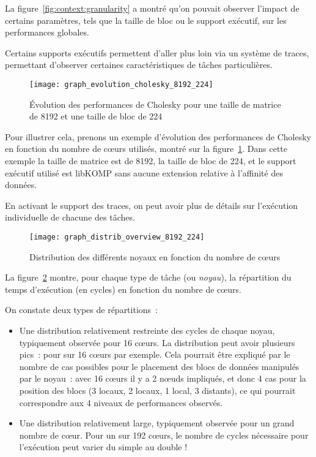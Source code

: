 La figure~\ref{fig:context:granularity} a montré qu'on pouvait observer l'impact de certains paramètres, tels que la taille de bloc ou le support exécutif, sur les performances globales.

Certains supports exécutifs permettent d'aller plus loin via un système de traces, permettant d'observer certaines caractéristiques de tâches particulières.

\begin{figure}[t!]
  \centering
  \texttt{[image: graph\_evolution\_cholesky\_8192\_224]}
  \caption{Évolution des performances de Cholesky pour une taille de matrice de 8192 et une taille de bloc de 224}\label{fig:contribs:apps:cholesky:overview-8192-224}
\end{figure}

Pour illustrer cela, prenons un exemple d'évolution des performances de Cholesky en fonction du nombre de cœurs utilisés, montré sur la figure~\ref{fig:contribs:apps:cholesky:overview-8192-224}. Dans cette exemple la taille de matrice est de 8192, la taille de bloc de 224, et le support exécutif utilisé est libKOMP sans aucune extension relative à l'affinité des données.

En activant le support des traces, on peut avoir plus de détails sur l'exécution individuelle de chacune des tâches.

\begin{figure}[h!]
  \centering
  \texttt{[image: graph\_distrib\_overview\_8192\_224]}
  \caption{Distribution des différents noyaux en fonction du nombre de cœurs}\label{fig:contribs:apps:cholesky:distrib-overview-8192-224}
\end{figure}

La figure~\ref{fig:contribs:apps:cholesky:distrib-overview-8192-224} montre, pour chaque type de tâche (ou \emph{noyau}), la répartition du temps d'exécution (en cycles) en fonction du nombre de cœurs.

On constate deux types de répartitions~:
\begin{itemize}
  \item Une distribution relativement restreinte des cycles de chaque noyau, typiquement observée pour 16 cœurs.
    La distribution peut avoir plusieurs pics~: pour \gemm sur 16 cœurs par exemple.
    Cela pourrait être expliqué par le nombre de cas possibles pour le placement des blocs de données manipulés par le noyau~: avec 16 cœurs il y a 2 nœuds impliqués, et donc 4 cas pour la position des blocs (3 locaux, 2 locaux, 1 local, 3 distants), ce qui pourrait correspondre aux 4 niveaux de performances observés.
  \item Une distribution relativement large, typiquement observée pour un grand nombre de cœur. Pour un \gemm sur 192 cœurs, le nombre de cycles nécessaire pour l'exécution peut varier du simple au double !
\end{itemize}

